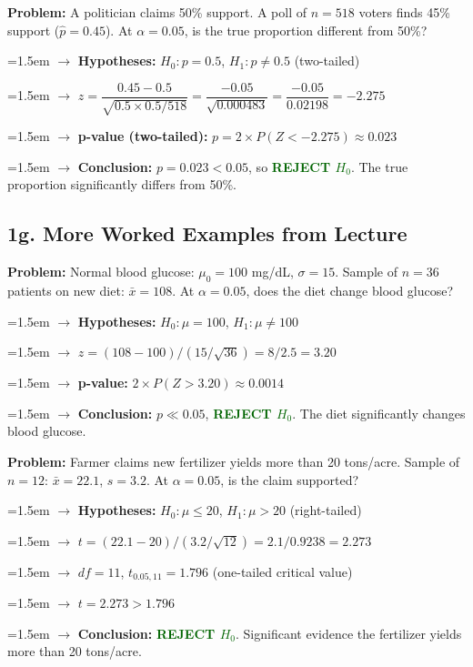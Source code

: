 \documentclass[11pt, letterpaper]{article}
\newcommand{\ans}[1]{\textbf{\textcolor{darkgreen}{#1}}}
\newcommand{\step}[1]{\par\hangindent=1.5em\hangafter=1 $\rightarrow$ #1}
\begin{document}
\begin{examplebox}
\textbf{Problem:} A politician claims 50\% support. A poll of $n=518$ voters finds 45\% support ($\hat{p}=0.45$). At $\alpha=0.05$, is the true proportion different from 50\%?

\step{\textbf{Hypotheses:} $H_0: p = 0.5$, \quad $H_1: p \neq 0.5$ (two-tailed)}
\step{$z = \dfrac{0.45 - 0.5}{\sqrt{0.5 \times 0.5 / 518}} = \dfrac{-0.05}{\sqrt{0.000483}} = \dfrac{-0.05}{0.02198} = \mathbf{-2.275}$}
\step{\textbf{p-value (two-tailed):} $p = 2 \times P(Z < -2.275) \approx 0.023$}
\step{\textbf{Conclusion:} $p = 0.023 < 0.05$, so \ans{REJECT $H_0$}. The true proportion significantly differs from 50\%.}
\end{examplebox}

\subsection{1g. More Worked Examples from Lecture}

\begin{examplebox}
\textbf{Problem:} Normal blood glucose: $\mu_0=100$ mg/dL, $\sigma=15$. Sample of $n=36$ patients on new diet: $\bar{x}=108$. At $\alpha=0.05$, does the diet change blood glucose?

\step{\textbf{Hypotheses:} $H_0: \mu = 100$, \quad $H_1: \mu \neq 100$}
\step{$z = (108 - 100) / (15/\sqrt{36}) = 8 / 2.5 = \mathbf{3.20}$}
\step{\textbf{p-value:} $2 \times P(Z > 3.20) \approx 0.0014$}
\step{\textbf{Conclusion:} $p \ll 0.05$, \ans{REJECT $H_0$}. The diet significantly changes blood glucose.}
\end{examplebox}

\begin{examplebox}
\textbf{Problem:} Farmer claims new fertilizer yields more than 20 tons/acre. Sample of $n=12$: $\bar{x}=22.1$, $s=3.2$. At $\alpha=0.05$, is the claim supported?

\step{\textbf{Hypotheses:} $H_0: \mu \leq 20$, \quad $H_1: \mu > 20$ (right-tailed)}
\step{$t = (22.1 - 20) / (3.2/\sqrt{12}) = 2.1 / 0.9238 = \mathbf{2.273}$}
\step{$df = 11$, $t_{0.05,11} = 1.796$ (one-tailed critical value)}
\step{$t = 2.273 > 1.796$}
\step{\textbf{Conclusion:} \ans{REJECT $H_0$}. Significant evidence the fertilizer yields more than 20 tons/acre.}
\end{examplebox}
\end{document}
